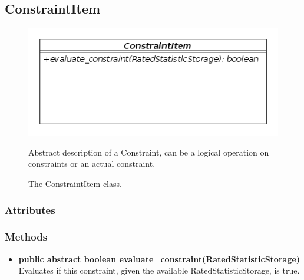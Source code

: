 \subsection{ConstraintItem}
\begin{figure}[htbp]
	\begin{minipage}[t]{8cm}
		\vspace{0pt}
		\centering
		\includegraphics[scale=0.6]{./diagram_pictures/reactor/ConstraintItem.png}
		\caption{The ConstraintItem class.}
	\end{minipage}
	\hfill
	\begin{minipage}[t]{6.5cm}
		\vspace{10pt}
			Abstract description of a Constraint, can be a logical operation on constraints or an actual constraint.
	\end{minipage}
\end{figure}  


\subsubsection{Attributes}
\subsubsection{Methods}
\begin{itemize}
	\item \textbf{ public abstract boolean evaluate\_constraint(RatedStatisticStorage) }\\
	Evaluates if this constraint, given the available RatedStatisticStorage, is true. 
\end{itemize}		


\newpage
